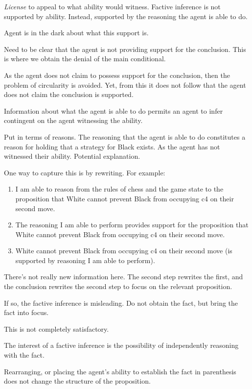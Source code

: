 \documentclass[10pt]{article}
\begin{document}
\emph{License} to appeal to what ability would witness.
Factive inference is not supported by ability.
Instead, supported by the reasoning the agent is able to do.

Agent is in the dark about what this support is.

Need to be clear that the agent is not providing support for the conclusion.
This is where we obtain the denial of the main conditional.

As the agent does not claim to possess support for the conclusion, then the problem of circularity is avoided.
Yet, from this it does not follow that the agent does not claim the conclusion is supported.

Information about what the agent is able to do permits an agent to infer contingent on the agent witnessing the ability.

Put in terms of reasons.
The reasoning that the agent is able to do constitutes a reason for holding that a strategy for Black exists.
As the agent has not witnessed their ability.
Potential explanation.

One way to capture this is by rewriting.
For example:

\begin{enumerate}
\item\label{potential:claim} I am able to reason from the rules of chess and the game state to the proposition that White cannot prevent Black from occupying c4 on their second move.
\item\label{potential:necessity} The reasoning I am able to perform provides support for the proposition that White cannot prevent Black from occupying c4 on their second move.
\item\label{potential:focus} White cannot prevent Black from occupying c4 on their second move (is supported by reasoning I am able to perform).
\end{enumerate}

There's not really new information here.
The second step rewrites the first, and the conclusion rewrites the second step to focus on the relevant proposition.

If so, the factive inference is misleading.
Do not obtain the fact, but bring the fact into focus.

This is not completely satisfactory.

The interest of a factive inference is the possibility of independently reasoning with the fact.

Rearranging, or placing the agent's ability to establish the fact in parenthesis does not change the structure of the proposition.
\end{document}
